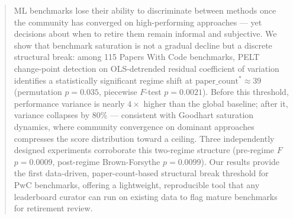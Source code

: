 \begin{abstract}
ML benchmarks lose their ability to discriminate between methods once the community has converged on high-performing approaches --- yet decisions about when to retire them remain informal and subjective. We show that benchmark saturation is not a gradual decline but a discrete structural break: among 115 Papers With Code benchmarks, PELT change-point detection on OLS-detrended residual coefficient of variation identifies a statistically significant regime shift at $\text{paper\_count}^* \approx 39$ (permutation $p=0.035$, piecewise $F$-test $p=0.0021$). Before this threshold, performance variance is nearly $4\times$ higher than the global baseline; after it, variance collapses by 80\% --- consistent with Goodhart saturation dynamics, where community convergence on dominant approaches compresses the score distribution toward a ceiling. Three independently designed experiments corroborate this two-regime structure (pre-regime $F$ $p=0.0009$, post-regime Brown-Forsythe $p=0.0099$). Our results provide the first data-driven, paper-count-based structural break threshold for PwC benchmarks, offering a lightweight, reproducible tool that any leaderboard curator can run on existing data to flag mature benchmarks for retirement review.
\end{abstract}
